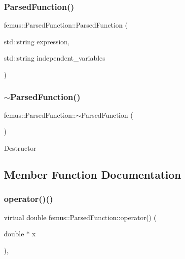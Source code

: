 \subsubsection{\texorpdfstring{Parsed\+Function()}{ParsedFunction()}\hspace{0.1cm}{\footnotesize\ttfamily [2/2]}}
{\footnotesize\ttfamily femus\+::\+Parsed\+Function\+::\+Parsed\+Function (\begin{DoxyParamCaption}\item[{std\+::string}]{expression,  }\item[{std\+::string}]{independent\+\_\+variables }\end{DoxyParamCaption})\hspace{0.3cm}{\ttfamily [inline]}}

\mbox{\label{classfemus_1_1_parsed_function_a618befb6d7fa2199e3234b830ce2bff8}} 
\subsubsection{\texorpdfstring{$\sim$\+Parsed\+Function()}{~ParsedFunction()}}
{\footnotesize\ttfamily femus\+::\+Parsed\+Function\+::$\sim$\+Parsed\+Function (\begin{DoxyParamCaption}{ }\end{DoxyParamCaption})\hspace{0.3cm}{\ttfamily [inline]}}

Destructor 

\subsection{Member Function Documentation}
\mbox{\label{classfemus_1_1_parsed_function_a409352beeaf46414a0f063ecd20a2ff2}} 
\subsubsection{\texorpdfstring{operator()()}{operator()()}}
{\footnotesize\ttfamily virtual double femus\+::\+Parsed\+Function\+::operator() (\begin{DoxyParamCaption}\item[{double $\ast$}]{x }\end{DoxyParamCaption})\hspace{0.3cm}{\ttfamily [inline]}, {\ttfamily [virtual]}}

